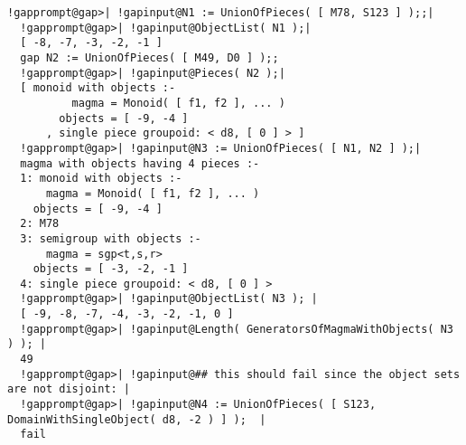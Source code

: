 \documentclass[a4paper,11pt]{report}
\begin{document}
{{\begin{Verbatim}[commandchars=!@|,fontsize=\small,frame=single,label=Example]
  !gapprompt@gap>| !gapinput@N1 := UnionOfPieces( [ M78, S123 ] );;|
  !gapprompt@gap>| !gapinput@ObjectList( N1 );|
  [ -8, -7, -3, -2, -1 ]
  gap N2 := UnionOfPieces( [ M49, D0 ] );;
  !gapprompt@gap>| !gapinput@Pieces( N2 );|
  [ monoid with objects :-
          magma = Monoid( [ f1, f2 ], ... )
        objects = [ -9, -4 ]
      , single piece groupoid: < d8, [ 0 ] > ]
  !gapprompt@gap>| !gapinput@N3 := UnionOfPieces( [ N1, N2 ] );|
  magma with objects having 4 pieces :-
  1: monoid with objects :-
      magma = Monoid( [ f1, f2 ], ... )
    objects = [ -9, -4 ]
  2: M78
  3: semigroup with objects :-
      magma = sgp<t,s,r>
    objects = [ -3, -2, -1 ]
  4: single piece groupoid: < d8, [ 0 ] >
  !gapprompt@gap>| !gapinput@ObjectList( N3 ); |
  [ -9, -8, -7, -4, -3, -2, -1, 0 ]
  !gapprompt@gap>| !gapinput@Length( GeneratorsOfMagmaWithObjects( N3 ) ); |
  49
  !gapprompt@gap>| !gapinput@## this should fail since the object sets are not disjoint: |
  !gapprompt@gap>| !gapinput@N4 := UnionOfPieces( [ S123, DomainWithSingleObject( d8, -2 ) ] );  |
  fail
  
\end{Verbatim}
 }

 }

            
\end{document}
